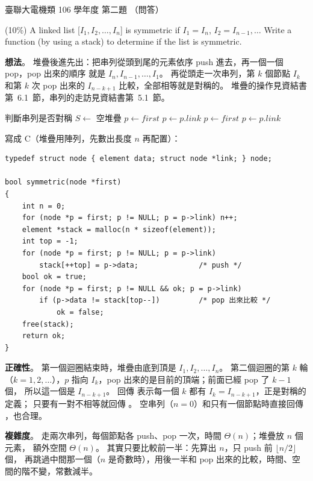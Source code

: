 \begin{pastexam}[label={px:ust-106-ee-ds-02}]{臺聯大電機類 106 學年度 第二題}
（問答）

(10\%) A linked list [$I_1, I_2, \ldots, I_n$] is symmetric if $I_1 = I_n$, $I_2 = I_{n-1}, \ldots$
Write a function (by using a stack) to determine if the list is symmetric.
\end{pastexam}

\begin{pastsoln}
\textbf{想法}。 堆疊後進先出：把串列從頭到尾的元素依序 push 進去，再一個一個 pop，pop 出來的順序
就是 $I_n, I_{n-1}, \ldots, I_1$。 再從頭走一次串列，第 $k$ 個節點 $I_k$ 和第 $k$ 次 pop 出來的
$I_{n-k+1}$ 比較，全部相等就是對稱的。 堆疊的操作見資結書第~6.1~節，串列的走訪見資結書第~5.1~節。

\begin{pseudo}{判斷串列是否對稱}
    \State $S \gets$ 空堆疊
    \State $p \gets \mathit{first}$
        \State {}
        \State $p \gets p.\mathit{link}$
    \EndWhile
    \State $p \gets \mathit{first}$
            \State \Return \FALSE
        \EndIf
        \State $p \gets p.\mathit{link}$
    \EndWhile
    \State \Return \TRUE
\EndFunction
\end{pseudo}

寫成 C（堆疊用陣列，先數出長度 $n$ 再配置）：
\begin{verbatim}
typedef struct node { element data; struct node *link; } node;

bool symmetric(node *first)
{
    int n = 0;
    for (node *p = first; p != NULL; p = p->link) n++;
    element *stack = malloc(n * sizeof(element));
    int top = -1;
    for (node *p = first; p != NULL; p = p->link)
        stack[++top] = p->data;              /* push */
    bool ok = true;
    for (node *p = first; p != NULL && ok; p = p->link)
        if (p->data != stack[top--])         /* pop 出來比較 */
            ok = false;
    free(stack);
    return ok;
}
\end{verbatim}

\textbf{正確性}。 第一個迴圈結束時，堆疊由底到頂是 $I_1, I_2, \ldots, I_n$。 第二個迴圈的第 $k$
輪（$k = 1, 2, \ldots$），$p$ 指向 $I_k$，pop 出來的是目前的頂端；前面已經 pop 了 $k - 1$ 個，
所以這一個是 $I_{n-k+1}$。 回傳 \TRUE 表示每一個 $k$ 都有 $I_k = I_{n-k+1}$，正是對稱的定義；
只要有一對不相等就回傳 \FALSE。 空串列（$n = 0$）和只有一個節點時直接回傳 \TRUE，也合理。

\textbf{複雜度}。 走兩次串列，每個節點各 push、pop 一次，時間 $\Theta(n)$；堆疊放 $n$ 個元素，
額外空間 $\Theta(n)$。 其實只要比較前一半：先算出 $n$，只 push 前 $\lfloor n/2 \rfloor$ 個，
再跳過中間那一個（$n$ 是奇數時），用後一半和 pop 出來的比較，時間、空間的階不變，常數減半。
\end{pastsoln}
